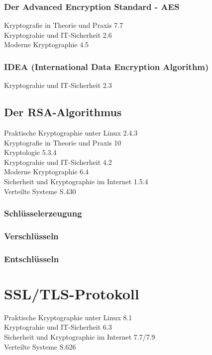 \documentclass[11pt]{scrartcl}
\begin{document}
\subsubsection{Der Advanced Encryption Standard - AES}
\label{sec:advanced-encryotion-standard}
Kryptografie in Theorie und Praxis 7.7\\
Kryptograhie und IT-Sicherheit 2.6\\
Moderne Kryptographie 4.5

\subsubsection{IDEA (International Data Encryption Algorithm)}
\label{sec:international-data-encryption-algorithm}
Kryptograhie und IT-Sicherheit 2.3

\subsection{Der RSA-Algorithmus}
\label{sec:rsa-algorithmus}
Praktische Kryptographie unter Linux 2.4.3\\
Kryptografie in Theorie und Praxis 10\\
Kryptologie 5.3.4\\
Kryptograhie und IT-Sicherheit 4.2\\
Moderne Kryptographie 6.4\\
Sicherheit und Kryptographie im Internet 1.5.4\\
Verteilte Systeme S.430

\subsubsection{Schlüsselerzeugung}
\label{sec:key-generation}

\subsubsection{Verschlüsseln}
\label{sec:rsa-encrypt}

\subsubsection{Entschlüsseln}
\label{sec:rsa-decrypt}

\section{SSL/TLS-Protokoll}
\label{sec:ssl/tls-protocol}
Praktische Kryptographie unter Linux 8.1\\
Kryptograhie und IT-Sicherheit 6.3\\
Sicherheit und Kryptographie im Internet 7.7/7.9\\
Verteilte Systeme S.626
\end{document}
